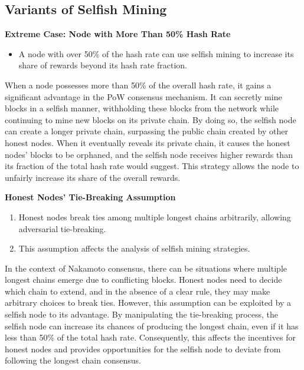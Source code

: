   
  \subsection{Variants of Selfish Mining}
  \textbf{Extreme Case: Node with More Than 50\% Hash Rate}
  \begin{itemize}
    \item A node with over 50\% of the hash rate can use selfish mining to increase its share of rewards beyond its hash rate fraction.
  \end{itemize}
  When a node possesses more than 50\% of the overall hash rate, it gains a significant advantage in the PoW consensus mechanism. It can secretly mine blocks in a selfish manner, withholding these blocks from the network while continuing to mine new blocks on its private chain. By doing so, the selfish node can create a longer private chain, surpassing the public chain created by other honest nodes. When it eventually reveals its private chain, it causes the honest nodes' blocks to be orphaned, and the selfish node receives higher rewards than its fraction of the total hash rate would suggest. This strategy allows the node to unfairly increase its share of the overall rewards.
  
  
  \textbf{Honest Nodes' Tie-Breaking Assumption}
  \begin{enumerate}
    \item Honest nodes break ties among multiple longest chains arbitrarily, allowing adversarial tie-breaking.
    \item This assumption affects the analysis of selfish mining strategies.
  \end{enumerate}
  In the context of Nakamoto consensus, there can be situations where multiple longest chains emerge due to conflicting blocks. Honest nodes need to decide which chain to extend, and in the absence of a clear rule, they may make arbitrary choices to break ties. However, this assumption can be exploited by a selfish node to its advantage. By manipulating the tie-breaking process, the selfish node can increase its chances of producing the longest chain, even if it has less than 50\% of the total hash rate. Consequently, this affects the incentives for honest nodes and provides opportunities for the selfish node to deviate from following the longest chain consensus.
  
